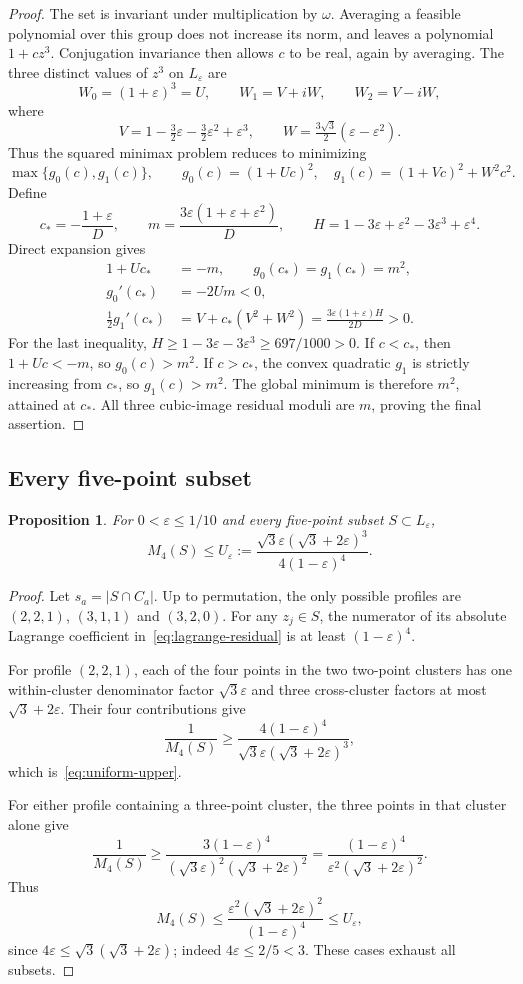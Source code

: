 \documentclass[11pt,a4paper]{article}
\newtheorem{proposition}[theorem]{Proposition}
\theoremstyle{remark}
\newcommand{\eps}{\varepsilon}
\newcommand{\om}{\omega}
\newcommand{\defeq}{\mathrel{:=}}
\begin{document}
\begin{proof}
The set is invariant under multiplication by $\om$. Averaging a feasible
polynomial over this group does not increase its norm, and leaves a polynomial
$1+cz^3$. Conjugation invariance then allows $c$ to be real, again by averaging.
The three distinct values of $z^3$ on $L_\eps$ are
\[
 W_0=(1+\eps)^3=U,\qquad W_1=V+iW,\qquad W_2=V-iW,
\]
where
\[
 V=1-\tfrac32\eps-\tfrac32\eps^2+\eps^3,
 \qquad W=\tfrac{3\sqrt3}{2}(\eps-\eps^2).
\]
Thus the squared minimax problem reduces to minimizing
\[
 \max\{g_0(c),g_1(c)\},\qquad
 g_0(c)=(1+Uc)^2,\quad g_1(c)=(1+Vc)^2+W^2c^2.
\]
Define
\[
 c_*=-\frac{1+\eps}{D},\qquad
 m=\frac{3\eps(1+\eps+\eps^2)}{D},\qquad
 H=1-3\eps+\eps^2-3\eps^3+\eps^4.
\]
Direct expansion gives
\begin{align*}
 1+Uc_*&=-m,\qquad g_0(c_*)=g_1(c_*)=m^2,\\
 g_0'(c_*)&=-2Um<0,\\
 \tfrac12 g_1'(c_*)&=V+c_*(V^2+W^2)
                 =\frac{3\eps(1+\eps)H}{2D}>0.
\end{align*}
For the last inequality,
$H\ge1-3\eps-3\eps^3\ge697/1000>0$.
If $c<c_*$, then $1+Uc<-m$, so $g_0(c)>m^2$.
If $c>c_*$, the convex quadratic $g_1$ is strictly increasing from $c_*$,
so $g_1(c)>m^2$. The global minimum is therefore $m^2$, attained at $c_*$.
All three cubic-image residual moduli are $m$, proving the final assertion.
\end{proof}

\subsection{Every five-point subset}
\begin{proposition}\label{prop:subset-upper}
For $0<\eps\le1/10$ and every five-point subset $S\subset L_\eps$,
\begin{equation}\label{eq:uniform-upper}
 M_4(S)\le
 U_\eps\defeq\frac{\sqrt3\eps(\sqrt3+2\eps)^3}{4(1-\eps)^4}.
\end{equation}
\end{proposition}

\begin{proof}
Let $s_a=|S\cap C_a|$. Up to permutation, the only possible profiles are
$(2,2,1)$, $(3,1,1)$ and $(3,2,0)$.
For any $z_j\in S$, the numerator of its absolute Lagrange coefficient
in~\eqref{eq:lagrange-residual} is at least $(1-\eps)^4$.

For profile $(2,2,1)$, each of the four points in the two two-point clusters
has one within-cluster denominator factor $\sqrt3\eps$ and three
cross-cluster factors at most $\sqrt3+2\eps$. Their four contributions give
\[
 \frac1{M_4(S)}\ge
 \frac{4(1-\eps)^4}{\sqrt3\eps(\sqrt3+2\eps)^3},
\]
which is~\eqref{eq:uniform-upper}.

For either profile containing a three-point cluster, the three points in
that cluster alone give
\[
 \frac1{M_4(S)}\ge
 \frac{3(1-\eps)^4}{(\sqrt3\eps)^2(\sqrt3+2\eps)^2}
 =\frac{(1-\eps)^4}{\eps^2(\sqrt3+2\eps)^2}.
\]
Thus
\[
 M_4(S)\le\frac{\eps^2(\sqrt3+2\eps)^2}{(1-\eps)^4}\le U_\eps,
\]
since $4\eps\le\sqrt3(\sqrt3+2\eps)$; indeed $4\eps\le2/5<3$.
These cases exhaust all subsets.
\end{proof}
\end{document}
